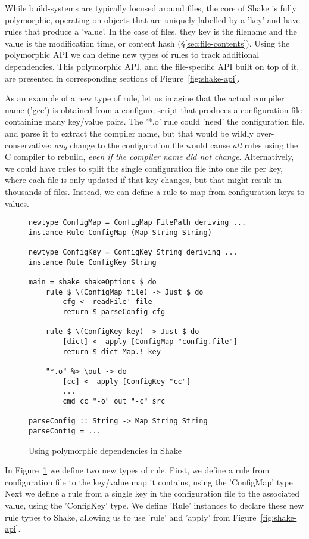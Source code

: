 While build-systems are typically focused around files, the core of Shake is
fully polymorphic, operating on objects that are uniquely labelled by a
\lst'key' and have rules that produce a \lst'value'.
In the case of files, they key is the filename and the value is the modification 
time, or content hash (\S\ref{sec:file-contents}).
Using the polymorphic API we can define new types of rules to track additional
dependencies.
This polymorphic API, and the file-specific API built on top
of it, are presented in corresponding sections of Figure~\ref{fig:shake-api}.

As an example of a new type of rule, let us imagine that the actual compiler
name (\lst'gcc') is obtained from a configure script that produces a
configuration file containing many key/value pairs. The \lst'*.o' rule could
\lst'need' the configuration file, and parse it to extract the compiler name,
but that would be wildly over-conservative: \emph{any} change to the
configuration file would cause \emph{all} rules using the C compiler to rebuild, 
\emph{even if the compiler name did not change}. Alternatively, we could have rules to split
the single configuration file into one file per key, where each file is only
updated if that key changes, but that might result in thousands of files.
Instead, we can define a rule to map from configuration keys to values.

\begin{figure}
\begin{lstlisting}
newtype ConfigMap = ConfigMap FilePath deriving ...
instance Rule ConfigMap (Map String String)

newtype ConfigKey = ConfigKey String deriving ...
instance Rule ConfigKey String

main = shake shakeOptions $ do
    rule $ \(ConfigMap file) -> Just $ do
        cfg <- readFile' file
        return $ parseConfig cfg

    rule $ \(ConfigKey key) -> Just $ do
        [dict] <- apply [ConfigMap "config.file"]
        return $ dict Map.! key

    "*.o" %> \out -> do
        [cc] <- apply [ConfigKey "cc"]
        ...
        cmd cc "-o" out "-c" src

parseConfig :: String -> Map String String
parseConfig = ...
\end{lstlisting}
\caption{Using polymorphic dependencies in Shake\label{fig:polymorphic-deps}}
\end{figure}

In Figure~\ref{fig:polymorphic-deps} we define two new types of rule. First, we
define a rule from configuration file to the key/value map it contains, using the
\lst'ConfigMap' type. Next we define a rule from a single key in the configuration file to the associated value,
using the \lst'ConfigKey' type. We define \lst'Rule' instances to declare these
new rule types to Shake, allowing us to use \lst'rule' and \lst'apply' from
Figure~\ref{fig:shake-api}.

